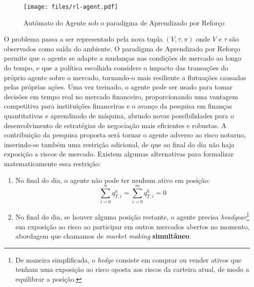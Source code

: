 \begin{figure}[H]
	\centering
	\texttt{[image: files/rl-agent.pdf]}
	\caption{Autômato do Agente sob o paradigma de Aprendizado por Reforço}
	\label{fig:rl-agent}
\end{figure}

O problema passa a ser representado pela nova tupla $(V, \tau, \pi)$ onde $V$ e $\tau$ são observados como saída do ambiente. O paradigma de Aprendizado por Reforço permite que o agente se adapte a mudanças nas condições de mercado ao longo do tempo, e que a política escolhida considere o impacto das transações do próprio agente sobre o mercado, tornando-o mais resiliente a flutuações causadas pelas próprias ações. Uma vez treinado, o agente pode ser usado para tomar decisões em tempo real no mercado financeiro, proporcionando uma vantagem competitiva para instituições financeiras e o avanço da pesquisa em finanças quantitativas e aprendizado de máquina, abrindo novas possibilidades para o desenvolvimento de estratégias de negociação mais eficientes e robustas. A contribuição da pesquisa proposta será tornar o agente adverso ao risco noturno, inserindo-se também uma restrição adicional, de que ao final do dia não haja exposição a riscos de mercado. 
Existem algumas alternativas para formalizar matematicamente essa restrição:
\begin{enumerate}
    \item No final do dia, o agente não pode ter nenhum ativo em posição: 
    \begin{equation} \label{overnight_restriction}
        \sum_{i = 0}^{n} q_{T, i}^{a}  = \sum_{i=0}^{m} q_{T, i}^{b} = 0
    \end{equation}
    \item No final do dia, se houver alguma posição restante, o agente precisa \textit{headgear}\footnote{De maneira simplificada, o \textit{hedge} consiste em comprar ou vender ativos que tenham uma exposição ao risco oposta aos riscos da carteira atual, de modo a equilibrar a posição.} sua exposição ao risco ao participar em outros mercados abertos no momento, abordagem que chamamos de \textit{market making} \textbf{simultâneo}.
\end{enumerate}
